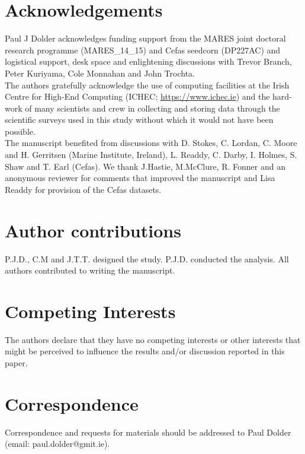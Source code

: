 \documentclass[fleqn,10pt]{wlscirep}
\begin{document}

\newpage



\section*{Acknowledgements} 
Paul J Dolder acknowledges funding support from the MARES joint doctoral
research programme (MARES\_14\_15) and Cefas seedcorn (DP227AC) and logistical
support, desk space and enlightening discussions with Trevor Branch, Peter
Kuriyama, Cole Monnahan and John Trochta.\\
	 
The authors gratefully acknowledge the use of computing facilities at the Irish
Centre for High-End Computing (ICHEC; \url{https://www.ichec.ie}) and the
hard-work of many scientists and crew in collecting and storing data through
the scientific surveys used in this study without which it would not have been
possible.  \\

The manuscript benefited from discussions with D. Stokes, C.  Lordan, C. Moore
and H. Gerritsen (Marine Institute, Ireland), L.  Readdy, C.  Darby, I. Holmes,
S. Shaw and T. Earl (Cefas). We thank J.Hastie, M.McClure, R. Fonner and an
anonymous reviewer for comments that improved the manuscript and Lisa Readdy
for provision of the Cefas datasets.

\section*{Author contributions}
P.J.D., C.M and J.T.T. designed the study. P.J.D. conducted the analysis. All
authors contributed to writing the manuscript.  


\section*{Competing Interests}
The authors declare that they have no competing interests or other interests
that might be perceived to influence the results and/or discussion reported in
this paper.

\section*{Correspondence}
Correspondence and requests for materials should be addressed to Paul Dolder
(email: paul.dolder@gmit.ie).
\end{document}
